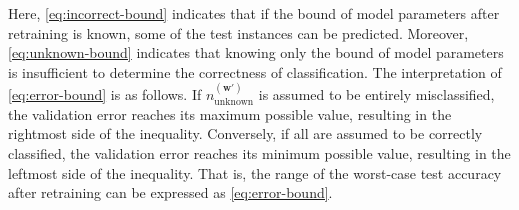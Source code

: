 %
Here, \eqref{eq:incorrect-bound} indicates that if the bound of model parameters after retraining is known, some of the test instances can be predicted.
%
%
Moreover, \eqref{eq:unknown-bound} indicates that knowing only the bound of model parameters is insufficient to determine the correctness of classification.
%
%
The interpretation of \eqref{eq:error-bound} is as follows.
%
If $n_\mathrm{unknown}^{(\bm w')}$ is assumed to be entirely misclassified, the validation error reaches its maximum possible value, resulting in the rightmost side of the inequality. Conversely, if all are assumed to be correctly classified, the validation error reaches its minimum possible value, resulting in the leftmost side of the inequality.
%
%
That is, the range of the worst-case test accuracy after retraining can be expressed as \eqref{eq:error-bound}.
%

